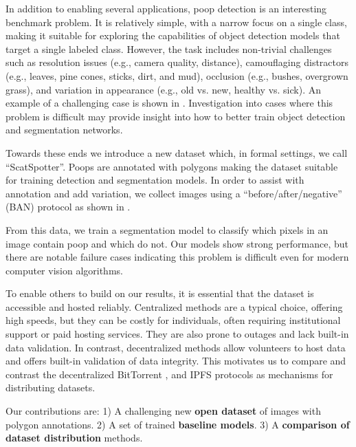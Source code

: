 \documentclass{article}
\begin{document}
In addition to enabling several applications, poop detection is an interesting benchmark problem.
It is relatively simple, with a narrow focus on a single class, making it suitable for exploring the
  capabilities of object detection models that target a single labeled class.
However, the task includes non-trivial challenges such as resolution issues (e.g., camera quality,
  distance), camouflaging distractors (e.g., leaves, pine cones, sticks, dirt, and mud), occlusion (e.g., bushes, overgrown
  grass), and variation in appearance (e.g., old vs. new, healthy vs. sick).
An example of a challenging case is shown in .
Investigation into cases where this problem is difficult may provide insight
into how to better train object detection and segmentation networks.

Towards these ends we introduce a new dataset which, 
in formal settings, we call ``ScatSpotter''.
Poops are annotated with polygons making the dataset suitable for training detection and segmentation
  models.
In order to assist with annotation and add variation, we collect images using a ``before/after/negative'' (BAN)
  protocol as shown in .

From this data, we train a segmentation model to classify which pixels in an image contain poop and which do
  not.
Our models show strong performance, but there are notable failure cases indicating this problem is difficult
  even for modern computer vision algorithms.

To enable others to build on our results, it is essential that the dataset is accessible and hosted
  reliably.
Centralized methods are a typical choice, offering high speeds, but they can be costly for individuals,
  often requiring institutional support or paid hosting services.
They are also prone to outages and lack built-in data validation.
In contrast, decentralized methods allow volunteers to host data and offers built-in validation of data
  integrity.
This motivates us to compare and contrast the decentralized BitTorrent \cite{cohen_incentives_2003}, and
  IPFS \cite{benet_ipfs_2014} protocols as mechanisms for distributing datasets.


Our contributions are:
1) A challenging new \textbf{open dataset} of images with polygon annotations.
2) A set of trained \textbf{baseline models}.
3) A \textbf{comparison of dataset distribution} methods.
\end{document}
